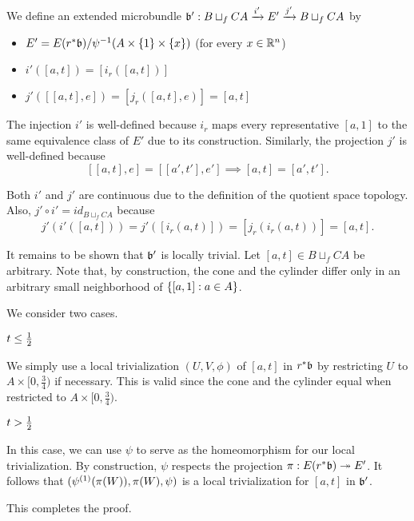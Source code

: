 \begin{myproof}
    We define an extended microbundle $\bundledef{\bb'}{B \sqcup_f CA}{E'}{i'}{j'}$ by
    \begin{itemize}
        \item $E' = E(\ind{r}\bb) / \inv{\psi}(A \cross \{1\} \cross \{x\})$ (for every $x \in \mathbb{R}^n$)
        \item $i'([a, t]) = [i_r([a, t])]$
        \item $j'([[a, t], e]) = [j_r([a, t], e)] = [a, t]$
    \end{itemize}
    The injection $i'$ is well-defined because $i_r$ maps every
    representative $[a, 1]$ to the same equivalence
    class of $E'$ due to its construction.
    Similarly, the projection $j'$ is well-defined because
    \[ [[a, t], e] = [[a', t'], e'] \implies  [a, t] = [a', t']. \]

    Both $i'$ and $j'$ are continuous
    due to the definition of the quotient space topology.
    Also, $j' \circ i' = id_{B \sqcup_f CA}$ because
    \[ j'(i'([a, t])) = j'([i_r(a, t)]) = [j_r(i_r(a, t))] = [a, t]. \]

    It remains to be shown that $\bb'$ is locally trivial.
    Let $[a, t] \in B \sqcup_f CA$ be arbitrary.
    Note that, by construction,
    the cone and the cylinder differ only
    in an arbitrary small neighborhood of $\{[a, 1]:a \in A\}$.

    We consider two cases.
    \begin{caselist}
        \item $t \le \frac{1}{2}$

        We simply use a local trivialization $(U, V, \phi)$ of $[a, t]$ in $\ind{r}\bb$
        by restricting $U$ to $A \times [0, \frac{3}{4})$ if necessary.
        This is valid since the cone and the cylinder equal when restricted to $A \times [0, \frac{3}{4})$.

        \item $t > \frac{1}{2}$
        
        In this case, we can use $\psi$ to serve as the homeomorphism for our local trivialization.
        By construction, $\psi$ respects the projection $\pi: E(\ind{r}\bb) \subm E'$.
        It follows that $(\psi^{(1)}(\pi(W)), \pi(W), \psi)$
        is a local trivialization for $[a, t]$ in $\bb'$.
    \end{caselist}
    This completes the proof.
\end{myproof}